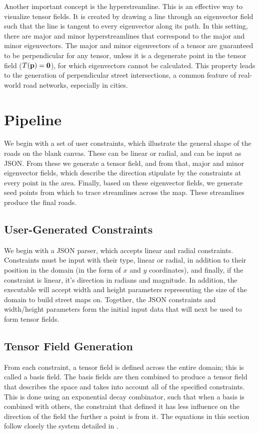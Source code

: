 \documentclass[twocolumn]{article}
\newcommand{\todo}[1]{\begin{center}\fbox{\parbox{150pt}{#1}}\end{center}}
\begin{document}
Another important concept is the hyperstreamline. This is an effective way to
visualize tensor fields. It is created by drawing a line through an eigenvector
field such that the line is tangent to every eigenvector along its path. In
this setting, there are major and minor hyperstreamlines that correspond to the
major and minor eigenvectors. The major and minor eigenvectors of a tensor are
guaranteed to be perpendicular for any tensor, unless it is a degenerate point
in the tensor field ($T(\bf p)=0$), for which eigenvectors cannot be
calculated. This property leads to the generation of perpendicular street
intersections, a common feature of real-world road networks, especially in
cities.

\section{Pipeline}
We begin with a set of user constraints, which illustrate the general shape of
the roads on the blank canvas. These can be linear or radial, and can be input
as JSON. From these we generate a tensor field, and from that, major and minor
eigenvector fields, which describe the direction stipulate by the constraints at
every point in the area. Finally, based on these eigenvector fields, we generate
seed points from which to trace streamlines across the map. These streamlines
produce the final roads.

\todo{insert pipeline diagram}

\subsection{User-Generated Constraints}
We begin with a JSON parser, which accepts linear and radial constraints.
Constraints must be input with their type, linear or radial, in addition to
their position in the domain (in the form of $x$ and $y$ coordinates), and
finally, if the constraint is linear, it’s direction in radians and magnitude.
In addition, the executable will accept width and height parameters
representing the size of the domain to build street maps on. Together, the JSON
constraints and width/height parameters form the initial input data that will
next be used to form tensor fields.

\subsection{Tensor Field Generation}
From each constraint, a tensor field is defined across the entire domain; this
is called a basis field. The basis fields are then combined to produce a tensor
field that describes the space and takes into account all of the specified
constraints. This is done using an exponential decay combinator, such that when
a basis is combined with others, the constraint that defined it has less
influence on the direction of the field the further a point is from it. The
equations in this section follow closely the system detailed in \cite{chen}.
\end{document}
